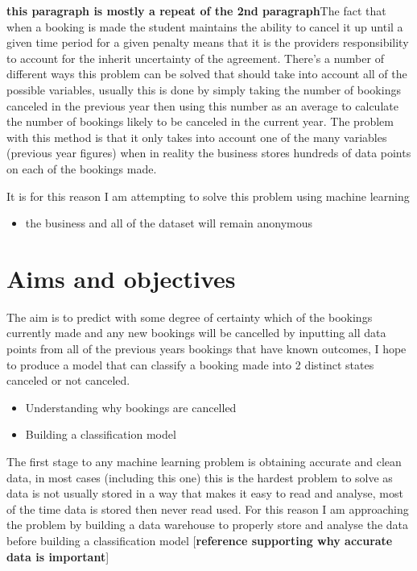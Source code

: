 \vspace{5mm}

\textbf{this paragraph is mostly a repeat of the 2nd paragraph}The fact that when a booking is made the student maintains the ability to cancel it up until a given time period for a given penalty means that it is the providers responsibility to account for the inherit uncertainty of the agreement. There's a number of different ways this problem can be solved that should take into account all of the possible variables, usually this is done by simply taking the number of bookings canceled in the previous year then using this number as an average to calculate the number of bookings likely to be canceled in the current year. The problem with this method is that it only takes into account one of the many variables (previous year figures) when in reality the business stores hundreds of data points on each of the bookings made.

It is for this reason I am attempting to solve this problem using machine learning


\begin{itemize}
\item  the business and all of the dataset will remain anonymous
\end{itemize}
    
\section{Aims and objectives}
The aim is to predict with some degree of certainty which of the bookings currently made and any new bookings will be cancelled by inputting all data points from all of the previous years bookings that have known outcomes, I hope to produce a model that can classify a booking made into 2 distinct states canceled or not canceled.

\begin{itemize}
\item Understanding why bookings are cancelled
\item Building a classification model
\end{itemize}


The first stage to any machine learning problem is obtaining accurate and clean data, in most cases (including this one) this is the hardest problem to solve as data is not usually stored in a way that makes it easy to read and analyse, most of the time data is stored  then never read used. For this reason I am approaching the problem by building a data warehouse to properly store and analyse the data before building a classification model [\textbf{reference supporting why accurate data is important}] 


